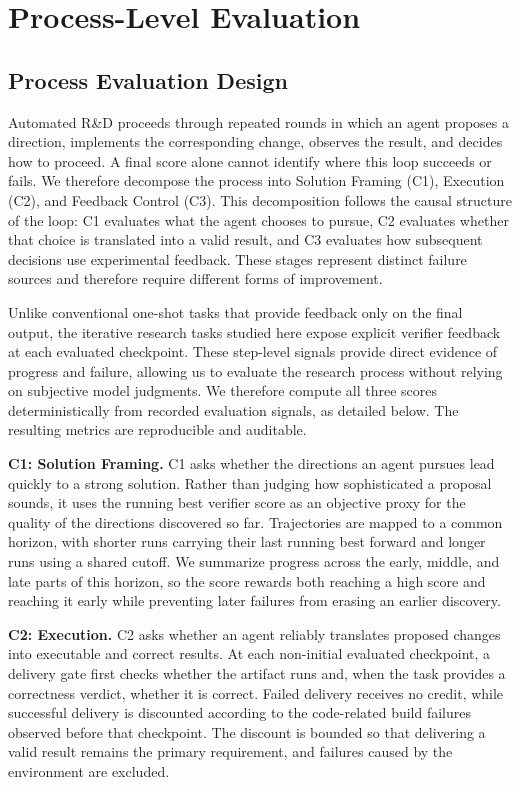\section{Process-Level Evaluation}

\subsection{Process Evaluation Design}
\label{sec:process_evaluation_design}

Automated R\&D proceeds through repeated rounds in which an agent proposes a direction, implements the corresponding change, observes the result, and decides how to proceed. A final score alone cannot identify where this loop succeeds or fails.  We therefore decompose the process into Solution Framing (C1), Execution (C2), and Feedback Control (C3). This decomposition follows the causal structure of the loop: C1 evaluates what the agent chooses to pursue, C2 evaluates whether that choice is translated into a valid result, and C3 evaluates how subsequent decisions use experimental feedback. These stages represent distinct failure sources and therefore require different forms of improvement.

Unlike conventional one-shot tasks that provide feedback only on the final output, the iterative research tasks studied here expose explicit verifier feedback at each evaluated checkpoint. These step-level signals provide direct evidence of progress and failure, allowing us to evaluate the research process without relying on subjective model judgments.  We therefore compute all three scores deterministically from recorded evaluation signals, as detailed below. The resulting metrics are reproducible and auditable.

\textbf{C1: Solution Framing.}
C1 asks whether the directions an agent pursues lead quickly to a strong solution.
Rather than judging how sophisticated a proposal sounds, it uses the running best verifier score as an objective proxy for the quality of the directions discovered so far.
Trajectories are mapped to a common horizon, with shorter runs carrying their last running best forward and longer runs using a shared cutoff.
We summarize progress across the early, middle, and late parts of this horizon, so the score rewards both reaching a high score and reaching it early while preventing later failures from erasing an earlier discovery.

\textbf{C2: Execution.}
C2 asks whether an agent reliably translates proposed changes into executable and correct results.
At each non-initial evaluated checkpoint, a delivery gate first checks whether the artifact runs and, when the task provides a correctness verdict, whether it is correct.
Failed delivery receives no credit, while successful delivery is discounted according to the code-related build failures observed before that checkpoint.
The discount is bounded so that delivering a valid result remains the primary requirement, and failures caused by the environment are excluded.

